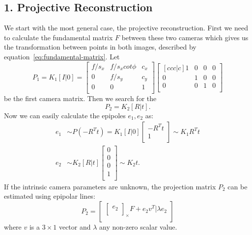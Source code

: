 \subsection*{1. Projective Reconstruction}
We start with the most general case, the projective reconstruction. First we need to calculate the fundamental matrix $F$ between these two cameras which gives us the transformation between points in both images, described by equation~\ref{eq:fundamental-matrix}. Let
\begin{equation}
	P_1= K_1[I|0] =
	\begin{bmatrix}
		f/s_x & f/s_x  cot \phi & c_x \\
		0 & f/s_y & c_y \\
		0 & 0  & 1 \\
	\end{bmatrix}
	\begin{bmatrix}[ccc|c]
		1 & 0 & 0 & 0 \\
		0 & 1 & 0 & 0 \\
		0 & 0 & 1 & 0 \\
	\end{bmatrix}
\end{equation}
be the first camera matrix. Then we search for the
\begin{equation}
	P_2 = K_2[R|t]. 
\end{equation}
Now we can easily calculate the epipoles $e_1, e_2$ as:
\begin{equation}
  \begin{aligned}
	e_1 &\sim P(-R^T t) = K_1 [I|0]
	\begin{bmatrix}
		-R^T t \\
		1 \\
	\end{bmatrix} \sim K_1 R^Tt \\
	e_2 &\sim K_2[R|t]
	\begin{bmatrix}
		0 \\
		0 \\
		0 \\
		1 \\
	\end{bmatrix} \sim K_2 t.
  \end{aligned}
\end{equation}
If the intrinsic camera parameters are unknown, the projection matrix $P_2$ can be estimated using epipolar lines:
\begin{equation}
	P_2 = 
	\begin{bmatrix}
		\begin{bmatrix}
			e_2 \\ 
		\end{bmatrix}_{\times} F + e_2 v^T | \lambda e_2 \\
	\end{bmatrix}
\end{equation}
where $v$ is a $3 \times 1$ vector and $\lambda$ any non-zero scalar value. 
